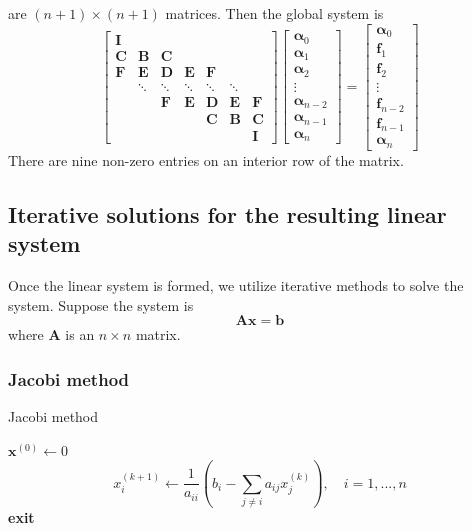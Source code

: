 \documentclass{article}
\begin{document}
are $(n+1) \times (n+1)$ matrices. Then the global system is
\begin{equation*}
    \begin{bmatrix}
    \bm I \\
    \bm C  & \bm B  & \bm C \\
    \bm F  & \bm E  & \bm D & \bm E & \bm F \\
          & \ddots & \ddots & \ddots & \ddots & \ddots \\ 
          &        & \bm F  & \bm E  & \bm D & \bm E & \bm F \\
          &        &               &             &   \bm C  & \bm B  & \bm C \\
          &        &               &             &              &    & \bm I
    \end{bmatrix}
    \begin{bmatrix}
    \bm\alpha_0 \\ \bm\alpha_1 \\ \bm\alpha_2 \\ \vdots \\ \bm\alpha_{n-2} \\ \bm\alpha_{n-1} \\ \bm\alpha_n
    \end{bmatrix}
    =
    \begin{bmatrix}
    \bm\alpha_0 \\ \bm f_1 \\ \bm f_2 \\ \vdots \\ \bm f_{n-2} \\ \bm f_{n-1} \\ \bm\alpha_n
    \end{bmatrix}    
\end{equation*}
There are nine non-zero entries on an interior row of the matrix.

\subsection{Iterative solutions for the resulting linear system}
Once the linear system is formed, we utilize iterative methods to solve the system. Suppose the system is
\begin{equation*}
    \bm{Ax} = \bm b
\end{equation*}
where $\bm A$ is an $n\times n$ matrix.

\subsubsection{Jacobi method}
\begin{algorithm}[H]
\caption{Jacobi method}
\begin{algorithmic}
\STATE $\bm x^{(0)} \leftarrow 0$
\STATE $$x_i^{(k+1)} \leftarrow \frac{1}{a_{ii}}\left(b_i - \sum_{j\ne i} a_{ij}x_j^{(k)}\right),
        \quad i = 1, ..., n$$
\STATE       \textbf{exit}
    \ENDIF
\ENDFOR
\end{algorithmic}
\end{algorithm}
\end{document}
